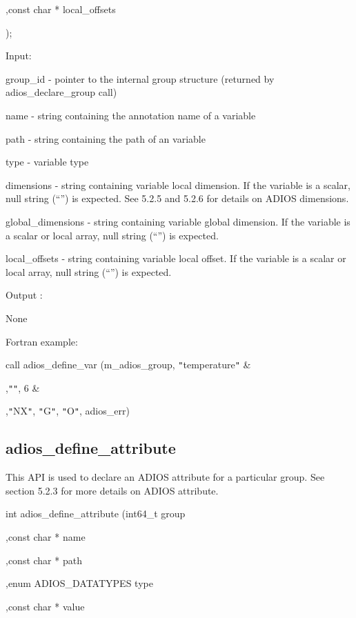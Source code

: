 \parindent=151pt
,const char * local\_offsets

);

Input: 

\leftskip=40pt
\parindent=0pt
group\_id - pointer to the internal group structure (returned by adios\_declare\_group 
call)

name - string containing the annotation name of a variable

path - string containing the path of an variable 

type - variable type 

dimensions - string containing variable local dimension. If the variable is a scalar, 
null string (``'') is expected. See 5.2.5 and 5.2.6 for details on ADIOS dimensions.

global\_dimensions - string containing variable global dimension. If the variable 
is a scalar or local array, null string (``'') is expected.

local\_offsets - string containing variable local offset. If the variable is a 
scalar or local array, null string (``'') is expected.

\parindent=-18pt
Output :

\leftskip=0pt
\parindent=18pt
None

\leftskip=22pt
\parindent=0pt
Fortran example: 

\leftskip=40pt
\parindent=3pt
call adios\_define\_var (m\_adios\_group, \texttt{"}temperature\texttt{"} \&

\parindent=93pt
,\texttt{"}\texttt{"}, 6 \&

,\texttt{"}NX\texttt{"}, \texttt{"}G\texttt{"}, \texttt{"}O\texttt{"}, adios\_err)\label{HToc182553360}

\subsection{adios\_define\_attribute}

\leftskip=0pt
\parindent=0pt
This API is used to declare an ADIOS attribute for a particular group. See section 
5.2.3 for more details on ADIOS attribute.

\leftskip=22pt
int adios\_define\_attribute (int64\_t group

\parindent=187pt
,const char * name

,const char * path

\parindent=374pt
,enum ADIOS\_DATATYPES type

\parindent=187pt
,const char * value

